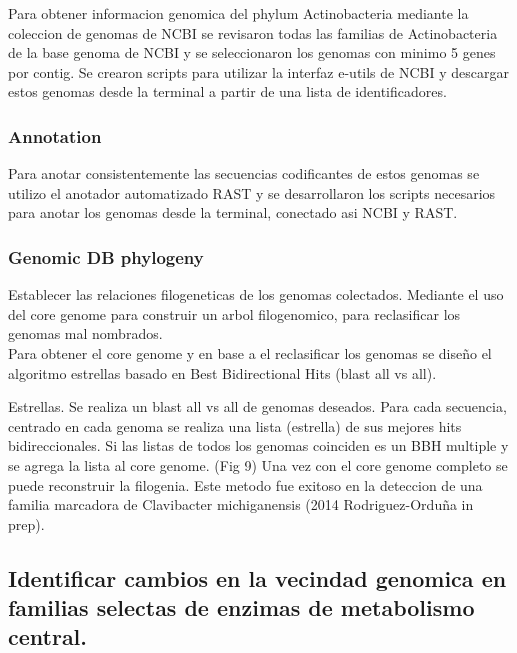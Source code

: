 \documentclass[12pt,twoside]{reedthesis}
\begin{document}
  Para obtener informacion genomica del phylum Actinobacteria mediante la
  coleccion de genomas de NCBI se revisaron todas las familias de
  Actinobacteria de la base genoma de NCBI y se seleccionaron los genomas
  con minimo 5 genes por contig. Se crearon scripts para utilizar la
  interfaz e-utils de NCBI y descargar estos genomas desde la terminal a
  partir de una lista de identificadores.
  
  \subsubsection{Annotation}\label{annotation}
  
  Para anotar consistentemente las secuencias codificantes de estos
  genomas se utilizo el anotador automatizado RAST y se desarrollaron los
  scripts necesarios para anotar los genomas desde la terminal, conectado
  asi NCBI y RAST.
  
  \subsubsection{Genomic DB phylogeny}\label{genomic-db-phylogeny}
  
  Establecer las relaciones filogeneticas de los genomas colectados.
  Mediante el uso del core genome para construir un arbol filogenomico,
  para reclasificar los genomas mal nombrados.\\
  Para obtener el core genome y en base a el reclasificar los genomas se
  diseño el algoritmo estrellas basado en Best Bidirectional Hits (blast
  all vs all).
  
  Estrellas. Se realiza un blast all vs all de genomas deseados. Para cada
  secuencia, centrado en cada genoma se realiza una lista (estrella) de
  sus mejores hits bidireccionales. Si las listas de todos los genomas
  coinciden es un BBH multiple y se agrega la lista al core genome. (Fig
  9) Una vez con el core genome completo se puede reconstruir la
  filogenia. Este metodo fue exitoso en la deteccion de una familia
  marcadora de Clavibacter michiganensis (2014 Rodriguez-Orduña in prep).
  
  \subsection{Identificar cambios en la vecindad genomica en familias
  selectas de enzimas de metabolismo
  central.}\label{identificar-cambios-en-la-vecindad-genomica-en-familias-selectas-de-enzimas-de-metabolismo-central.}
  
\end{document}
